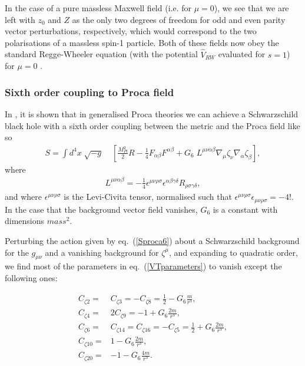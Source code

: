 \documentclass[10pt,twocolumn,preprintnumbers,amsmath,amssymb,nofootinbib
,superscriptaddress]{revtex4-1}
\begin{document}
{{{In the case of a pure massless Maxwell field (i.e. for $\mu=0$), we see that we are left with $z_0$ and $Z$ as the only two degrees of freedom for odd and even parity vector perturbations, respectively, which would correspond to the two polarisations of a massless spin-1 particle. Both of these fields now obey the standard Regge-Wheeler equation (with the potential $\hat{V}_{RW}$ evaluated for $s=1$) for $\mu=0$ \cite{Zhang:2006hh,Toshmatov:2015wga,Medved:2003rga}. 

\subsubsection{Sixth order coupling to Proca field}
\label{procadual}
In \cite{2017JCAP...08..024H}, it is shown that in generalised Proca theories we can achieve a Schwarzschild black hole with a sixth order coupling between the metric and the Proca field like so
\begin{align}
S=\int d^4x\;\sqrt{-g}&\;\left[\frac{M_{Pl}^2}{2}R-\frac{1}{4}F_{\alpha\beta}F^{\alpha\beta}+G_6\;L^{\mu\nu\alpha\beta}\nabla_\mu\zeta_\nu\nabla_\alpha\zeta_\beta\right],\label{Sproca6}
\end{align}
where
\begin{align}
L^{\mu\nu\alpha\beta}=-\frac{1}{4}\epsilon^{\mu\nu\rho\sigma}\epsilon^{\alpha\beta\gamma\delta}R_{\rho\sigma\gamma\delta},
\end{align}
and where $\epsilon^{\mu\nu\rho\sigma}$ is the Levi-Civita tensor, normalised such that $\epsilon^{\mu\nu\rho\sigma}\epsilon_{\mu\nu\rho\sigma}=-4!$. In the case that the background vector field vanishes, $G_6$ is a constant with dimensions $mass^2$. 

Perturbing the action given by eq.~(\ref{Sproca6}) about a Schwarzschild background for the $g_{\mu\nu}$ and a vanishing background for $\zeta^\mu$, and expanding to quadratic order, we find most of the parameters in eq.~(\ref{VTparameters}) to vanish except the following ones: 

\begin{align}
C_{\zeta2}=&C_{\zeta3}=-C_{\zeta8}=\frac{1}{2}-G_6\frac{m}{r^3},\nonumber\\
C_{\zeta4}=&2C_{\zeta9}=-1+ G_6\frac{2m}{r^3},\nonumber\\
C_{\zeta6}=&C_{\zeta14}=C_{\zeta16}=-C_{\zeta5}=\frac{1}{2}+G_6\frac{2m}{r^3},\nonumber\\
C_{\zeta10}=&1-G_6\frac{2m}{r^3},\nonumber\\
C_{\zeta20}=&-1-G_6\frac{4m}{r^3}.
\end{align}

}}}
\end{document}
